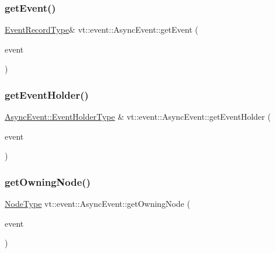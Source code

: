 \mbox{\label{structvt_1_1event_1_1_async_event_a78e777586ef948a4436b8dcea3c33be4}} 
\subsubsection{\texorpdfstring{get\+Event()}{getEvent()}}
{\footnotesize\ttfamily \hyperlink{structvt_1_1event_1_1_async_event_a5b4ef37db6e5962fdc0e6e0e56e74bc1}{Event\+Record\+Type}\& vt\+::event\+::\+Async\+Event\+::get\+Event (\begin{DoxyParamCaption}\item[{\hyperlink{namespacevt_a009267401def7ae8bf201892222d060f}{Event\+Type} const \&}]{event }\end{DoxyParamCaption})}

\mbox{\label{structvt_1_1event_1_1_async_event_a27d14dba4b35f66aad75d46fb56227a9}} 
\subsubsection{\texorpdfstring{get\+Event\+Holder()}{getEventHolder()}}
{\footnotesize\ttfamily \hyperlink{structvt_1_1event_1_1_async_event_a6b529d829ccb5b12c50c2b1978c41a86}{Async\+Event\+::\+Event\+Holder\+Type} \& vt\+::event\+::\+Async\+Event\+::get\+Event\+Holder (\begin{DoxyParamCaption}\item[{\hyperlink{namespacevt_a009267401def7ae8bf201892222d060f}{Event\+Type} const \&}]{event }\end{DoxyParamCaption})}

\mbox{\label{structvt_1_1event_1_1_async_event_a288c3db66bf12de8dc65733b184870c0}} 
\subsubsection{\texorpdfstring{get\+Owning\+Node()}{getOwningNode()}}
{\footnotesize\ttfamily \hyperlink{namespacevt_a866da9d0efc19c0a1ce79e9e492f47e2}{Node\+Type} vt\+::event\+::\+Async\+Event\+::get\+Owning\+Node (\begin{DoxyParamCaption}\item[{\hyperlink{namespacevt_a009267401def7ae8bf201892222d060f}{Event\+Type} const \&}]{event }\end{DoxyParamCaption})}

